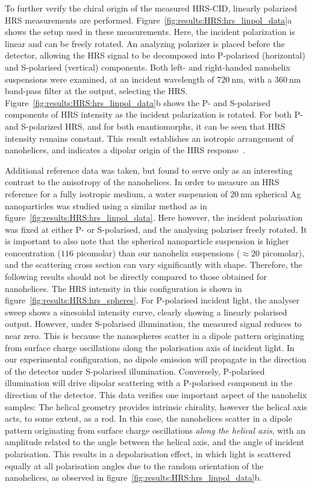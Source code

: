 To further verify the chiral origin of the measured HRS-CID, linearly polarized HRS measurements are performed. Figure~\ref{fig:results:HRS:hrs_linpol_data}a shows the setup used in these measurements. Here, the incident polarization is linear and can be freely rotated. An analyzing polarizer is placed before the detector, allowing the HRS signal to be decomposed into P-polarised (horizontal) and S-polarised (vertical) components. Both left- and right-handed nanohelix suspensions were examined, at an incident wavelength of $\SI{720}{\nano\m}$, with a $\SI{360}{\nano\m}$ band-pass filter at the output, selecting the HRS. 
Figure~\ref{fig:results:HRS:hrs_linpol_data}b shows the P- and S-polarised components of HRS intensity as the incident polarization is rotated. For both P- and S-polarized HRS, and for both enantiomorphs, it can be seen that HRS intensity remains constant. This result establishes an isotropic arrangement of nanohelices, and indicates a dipolar origin of the HRS response~\cite{Hao2002b, verbiest2009second}. 

Additional reference data was taken, but found to serve only as an interesting contrast to the anisotropy of the nanohelices. In order to measure an HRS reference for a fully isotropic medium, a water suspension of $\SI{20}{\nano\m}$ spherical Ag nanoparticles was studied using a similar method as in figure~\ref{fig:results:HRS:hrs_linpol_data}. Here however, the incident polarisation was fixed at either P- or S-polarised, and the analysing polariser freely rotated. 
It is important to also note that the spherical nanoparticle suspension is higher concentration ($116$ picomolar) than our nanohelix suspensions ($\approx 20$ picomolar), and the scattering cross section can vary significantly with shape.
Therefore, the following results should not be directly compared to those obtained for nanohelices.
The HRS intensity in this configuration is shown in figure~\ref{fig:results:HRS:hrs_spheres}. 
For P-polarised incident light, the analyser sweep shows a sinesoidal intensity curve, clearly showing a linearly polarised output. However, under S-polarised illumination, the measured signal reduces to near zero. This is because the nanospheres scatter in a dipole pattern originating from surface charge oscillations along the polarisation axis of incident light. 
In our experimental configuration, no dipole emission will propagate in the direction of the detector under S-polarised illumination. Conversely, P-polarised illumination will drive dipolar scattering with a P-polarised component in the direction of the detector. This data verifies one important aspect of the nanohelix samples: The helical geometry provides intrinsic chirality, however the helical axis acts, to some extent, as a rod. In this case, the nanohelices scatter in a dipole pattern originating from surface charge oscillations \textit{along the helical axis}, with an amplitude related to the angle between the helical axis, and the angle of incident polarisation. 
This results in a depolarisation effect, in which light is scattered equally at all polarisation angles due to the random orientation of the nanohelices, as observed in figure~\ref{fig:results:HRS:hrs_linpol_data}b.

